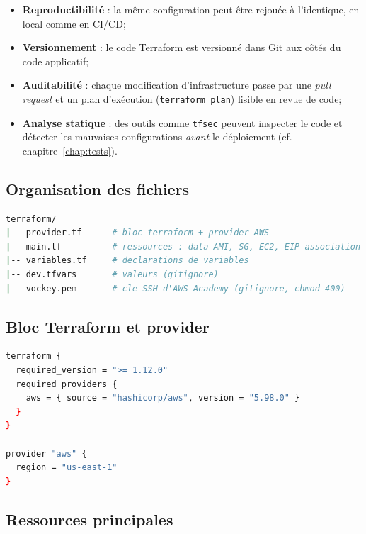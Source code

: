 \begin{itemize}
  \item \textbf{Reproductibilité} : la même configuration peut être
        rejouée à l'identique, en local comme en CI/CD;
  \item \textbf{Versionnement} : le code Terraform est versionné dans
        Git aux côtés du code applicatif;
  \item \textbf{Auditabilité} : chaque modification d'infrastructure
        passe par une \emph{pull request} et un plan d'exécution
        (\texttt{terraform plan}) lisible en revue de code;
  \item \textbf{Analyse statique} : des outils comme \texttt{tfsec}
        peuvent inspecter le code et détecter les mauvaises
        configurations \emph{avant} le déploiement (cf.
        chapitre~\ref{chap:tests}).
\end{itemize}

\subsection{Organisation des fichiers}

\begin{lstlisting}[language=bash, caption={Arborescence du module Terraform.}]
terraform/
|-- provider.tf      # bloc terraform + provider AWS
|-- main.tf          # ressources : data AMI, SG, EC2, EIP association
|-- variables.tf     # declarations de variables
|-- dev.tfvars       # valeurs (gitignore)
|-- vockey.pem       # cle SSH d'AWS Academy (gitignore, chmod 400)
\end{lstlisting}

\subsection{Bloc Terraform et provider}

\begin{lstlisting}[language=bash, caption={\texttt{provider.tf}.}]
terraform {
  required_version = ">= 1.12.0"
  required_providers {
    aws = { source = "hashicorp/aws", version = "5.98.0" }
  }
}

provider "aws" {
  region = "us-east-1"
}
\end{lstlisting}

\subsection{Ressources principales}

